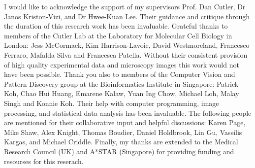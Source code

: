 \begin{acknowledgements}
I would like to acknowledge the support of my supervisors Prof. Dan Cutler, Dr Janos Kriston-Vizi, and Dr Hwee-Kuan Lee. Their guidance and critique through the duration of this research work has been invaluable. Grateful thanks to members of the Cutler Lab at the Laboratory for Molecular Cell Biology in London: Jess McCormack, Kim Harrison-Lavoie, David Westmoreland, Francesco Ferraro, Mafalda Silva and Francesca Patella. Without their consistent provision of high quality experimental data and microscopy images this work would not have been possible. Thank you also to members of the Computer Vision and Pattern Discovery group at the Bioinformatics Institute in Singapore: Patrick Koh, Chao Hui Huang, Emarene Kalaw, Yuan Ing Chow, Michael Loh, Malay Singh and Konnie Koh. Their help with computer programming, image processing, and statistical data analysis has been invaluable. The following people are mentioned for their collaborative input and helpful discussions: Karen Page, Mike Shaw, Alex Knight, Thomas Boudier, Daniel Holdbrook, Lin Gu, Vassilis Kargas, and Michael Criddle. Finally, my thanks are extended to the Medical Research Council (UK) and A*STAR (Singapore) for providing funding and resourses for this reserach.
\end{acknowledgements}
